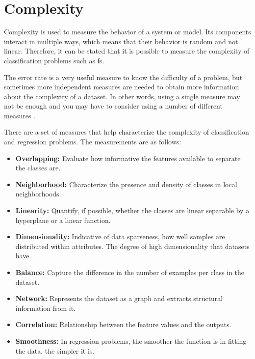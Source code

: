 \section{Complexity}
\label{sec:complexity}

Complexity is used to measure the behavior of a system or model. Its components interact in multiple ways, which means that their behavior is random and not linear. Therefore, it can be stated that it is possible to measure the complexity of classification problems such as \acrlong{fs}.

The error rate is a very useful measure to know the difficulty of a problem, but sometimes more independent measures are needed to obtain more information about the complexity of a dataset. In other words, using a single measure may not be enough and you may have to consider using a number of different measures \cite{TinKamHoBasu2002}.

There are a set of measures that help characterize the complexity of classification and regression problems. The measurements are as follows:

\begin{itemize}
    \item \textbf{Overlapping:} Evaluate how informative the features available to separate the classes are.
    
    \item \textbf{Neighborhood:} Characterize the presence and density of classes in local neighborhoods.
    
    \item \textbf{Linearity:} Quantify, if possible, whether the classes are linear separable by a hyperplane or a linear function.
    
    \item \textbf{Dimensionality:} Indicative of data sparseness, how well samples are distributed within attributes. The degree of high dimensionality that datasets have.
    
    \item \textbf{Balance:} Capture the difference in the number of examples per class in the dataset.
    
    \item \textbf{Network:} Represents the dataset as a graph and extracts structural information from it.
    
    \item \textbf{Correlation:} Relationship between the feature values and the outputs.
    
    \item \textbf{Smoothness:} In regression problems, the smoother the function is in fitting the data, the simpler it is.
\end{itemize}

